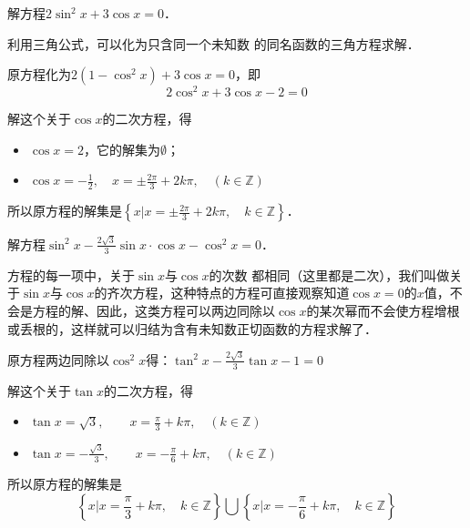 \begin{example}
    解方程$2\sin^2x+3\cos x=0$．
\end{example}

\begin{analyze}
    利用三角公式，可以化为只含同一个未知数
的同名函数的三角方程求解．
\end{analyze}

\begin{solution}
    原方程化为$2(1-\cos^2x)+3\cos x=0$，即
\[2\cos^2x+3\cos x-2=0\]

解这个关于$\cos x$的二次方程，得
\begin{itemize}
    \item $\cos x=2$，它的解集为$\emptyset$；
    \item $\cos x=-\frac{1}{2},\quad x=\pm\frac{2\pi}{3}+2k\pi,\quad (k\in\mathbb{Z})$
\end{itemize}
所以原方程的解集是$\left\{x\Big|x=\pm \frac{2\pi}{3}+2k\pi,\quad k\in\mathbb{Z}\right\}$．
\end{solution}

\begin{example}
    解方程$\sin^2x-\frac{2\sqrt{3}}{3}\sin x\cdot \cos x-\cos^2x=0$．
\end{example}

\begin{analyze}
    方程的每一项中，关于$\sin x$与$\cos x$的次数
都相同（这里都是二次），我们叫做关于$\sin x$与$\cos x$的齐次方程，这种特点的方程可直接观察知道$\cos x=0$的$x$值，不会是方程的解、因此，这类方程可以两边同除以$\cos x$的某次幂而不会使方程增根或丢根的，这样就可以归结为含有未知数正切函数的方程求解了．
\end{analyze}

\begin{solution}
    原方程两边同除以$\cos^2x$得：$\tan^2x-\frac{2\sqrt{3}}{3}\tan x-1=0$

    解这个关于$\tan x$的二次方程，得
\begin{itemize}
    \item $\tan x=\sqrt{3},\qquad x=\frac{\pi}{3}+k\pi,\quad (k\in\mathbb{Z})$
    \item $\tan x=-\frac{\sqrt{3}}{3},\qquad x=-\frac{\pi}{6}+k\pi,\quad (k\in\mathbb{Z})$
\end{itemize}
所以原方程的解集是
\[\left\{x\Big|x=\frac{\pi}{3}+k\pi,\quad k\in\mathbb{Z} \right\}\bigcup \left\{x\Big| x=-\frac{\pi}{6}+k\pi,\quad k\in\mathbb{Z}\right\}\]

\end{solution}


